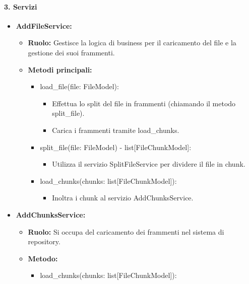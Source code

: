     \paragraph{3. Servizi}
    \begin{itemize}
        \item \textbf{AddFileService:}
        \begin{itemize}
            \item \textbf{Ruolo:} Gestisce la logica di business per il caricamento del file e la gestione dei suoi frammenti.
            \item \textbf{Metodi principali:}
            \begin{itemize}
                \item load\_file(file: FileModel):
                \begin{itemize}
                    \item Effettua lo split del file in frammenti (chiamando il metodo split\_file).
                    \item Carica i frammenti tramite load\_chunks.
                \end{itemize}
                \item split\_file(file: FileModel) - list[FileChunkModel]:
                \begin{itemize}
                    \item Utilizza il servizio SplitFileService per dividere il file in chunk.
                \end{itemize}
                \item load\_chunks(chunks: list[FileChunkModel]):
                \begin{itemize}
                    \item Inoltra i chunk al servizio AddChunksService.
                \end{itemize}
            \end{itemize}
        \end{itemize}
        \item \textbf{AddChunksService:}
        \begin{itemize}
            \item \textbf{Ruolo:} Si occupa del caricamento dei frammenti nel sistema di repository.
            \item \textbf{Metodo:}
            \begin{itemize}
                \item load\_chunks(chunks: list[FileChunkModel]):

\end{itemize}
\end{itemize}
\end{itemize}
